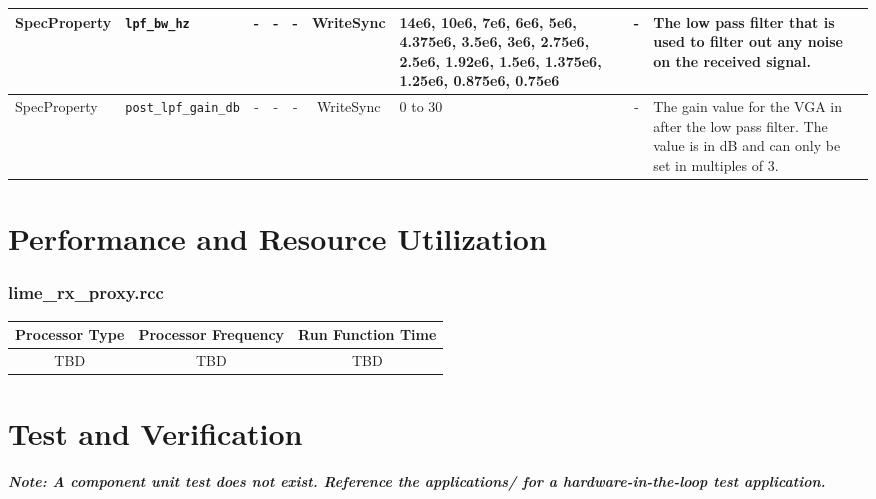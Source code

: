 \documentclass{article}
\def\comp{lime\_rx\_proxy}
\begin{document}
\begin{landscape}
\begin{scriptsize}
\begin{tabular}{|p{2cm}|p{3cm}|c|c|c|c|p{2.5cm}|c|p{7cm}|}
			\hline
			SpecProperty & \verb+lpf_bw_hz+              & -    & -        & -          & WriteSync      & 14e6, 10e6, 7e6, 6e6, 5e6, 4.375e6, 3.5e6, 3e6, 2.75e6, 2.5e6, 1.92e6, 1.5e6, 1.375e6, 1.25e6, 0.875e6, 0.75e6 & -       & The low pass filter that is used to filter out any noise on the received signal.                                                                                                                                                                                    \\
			\hline
			SpecProperty & \verb+post_lpf_gain_db+       & -    & -        & -          & WriteSync      & 0 to 30                                                                                                        & -       & The gain value for the VGA in after the low pass filter. The value is in dB and can only be set in multiples of 3.                                                                                                                                                  \\
			\hline
		\end{tabular}
	\end{scriptsize}
\end{landscape}

\section*{Performance and Resource Utilization}
\subsubsection*{\comp.rcc}
\begin{scriptsize}
	\begin{tabular}{|c|c|c|}
		\hline
		\rowcolor{blue}
		Processor Type & Processor Frequency & Run Function Time \\
		\hline
		TBD            & TBD                 & TBD               \\
		\hline
	\end{tabular}
\end{scriptsize}

\section*{Test and Verification}

\textit{\textbf{Note: A component unit test does not exist.  Reference the applications/ for a hardware-in-the-loop test application.}}\\ \medskip
\end{document}
